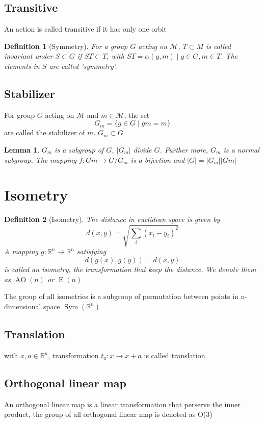 \documentclass{amsart}
\newcommand{\setM}{\mathcal{M}}
\newtheorem{definition}{Definition}
\newtheorem{lemma}{Lemma}
\DeclareMathOperator{\AO}{AO}
\DeclareMathOperator{\E}{E}
\DeclareMathOperator{\Sym}{Sym}
\begin{document}
\subsection*{Transitive}
An action is called transitive if it has only one orbit

\begin{definition}
    [Symmetry]
    For a group $G$ acting on $\setM$, $T\subset M$ is called invariant under $S \subset G$ if $ST\subset T$, 
    with $ST = {\alpha(g,m)\mid g \in G, m\in T}$. 
    The elements in $S$ are called 'symmetry'.
\end{definition}

\subsection*{Stabilizer}
For group $G$ acting on $\setM$ and $m \in \setM$, the set 
\[G_m = \{ g\in G\mid gm = m \}\]
are called the stabilizer of $m$. $G_m \subset G$

\begin{lemma}
    $G_m$ is a subgroup of $G$, $|G_m|$ divide $G$. Further more, $G_m$ is a normal subgroup. 
    The mapping $f\colon Gm \to G/G_m$ is a bijection and $|G|=|G_m||Gm|$
\end{lemma}

\section{Isometry}

\begin{definition}
    [Isometry]
    The distance in euclidean space is given by 
    \[
        d(x,y) = \sqrt{\sum_i(x_i-y_i)^2}    
    \]
    A mapping $g\colon \mathbb{R}^n \to \mathbb{R}^n$ satisfying 
    \[
        d(g(x),g(y)) = d(x,y)    
    \] is called an isometry, the transformation that keep the distance. We denote them as $\AO(n)$ or $\E(n)$
\end{definition}
The group of all isometries is a subgroup of permutation between points in n-dimensional space $\Sym(\mathbb{R}^n)$

\subsection*{Translation}
with $x, a \in \mathbb{R}^n$, transformation $t_a\colon x \to x+a$ is called translation.

\subsection*{Orthogonal linear map}
An orthogonal linear map is a linear transformation that perserve the inner product, the group of all
orthogonal linear map is denoted as O($3$)
\end{document}
